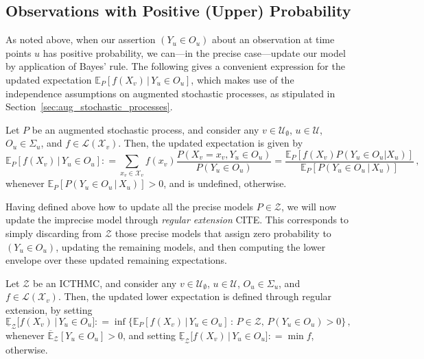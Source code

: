 \documentclass[twoside,11pt]{article}
\newcommand{\states}{\mathcal{X}}
\newcommand{\gambles}{\mathcal{L}}
\newcommand{\coloneqq}{:\!=}
\begin{document}
\subsection{Observations with Positive (Upper) Probability}

As noted above, when our assertion $(Y_u\in O_u)$ about an observation at time points $u$ has positive probability, we can---in the precise case---update our model by application of Bayes' rule. The following gives a convenient expression for the updated expectation $\mathbb{E}_P[f(X_v)\,\vert\,Y_u\in O_u]$, which makes use of the independence assumptions on augmented stochastic processes, as stipulated in Section~\ref{sec:aug_stochastic_processes}.

\begin{proposition}\label{prop:precise_conditioning_for_positive}
Let $P$ be an augmented stochastic process, and consider any $v\in\mathcal{U}_\emptyset$, $u\in\mathcal{U}$, $O_u\in\Sigma_u$, and $f\in\gambles(\states_v)$. Then, the updated expectation is given by
\begin{equation*}
\mathbb{E}_P[f(X_v)\,\vert\,Y_u\in O_u] \coloneqq \sum_{x_v\in\states_v}f(x_v)\frac{P(X_v=x_v, Y_u\in O_u)}{P(Y_u\in O_u)} = \frac{\mathbb{E}_P[f(X_v)P(Y_u\in O_u\vert X_u)]}{\mathbb{E}_P[P(Y_u\in O_u\,\vert\,X_u)]}\,,
\end{equation*}
whenever $\mathbb{E}_P[P(Y_u\in O_u\,\vert\,X_u)]>0$, and is undefined, otherwise.
\end{proposition}

Having defined above how to update all the precise models $P\in\mathcal{Z}$, we will now update the imprecise model through \emph{regular extension} CITE. This corresponds to simply discarding from $\mathcal{Z}$ those precise models that assign zero probability to $(Y_u\in O_u)$, updating the remaining models, and then computing the lower envelope over these updated remaining expectations.

\begin{definition}
Let $\mathcal{Z}$ be an ICTHMC, and consider any $v\in\mathcal{U}_\emptyset$, $u\in\mathcal{U}$, $O_u\in\Sigma_u$, and $f\in\gambles(\states_v)$. Then, the updated lower expectation is defined through regular extension, by setting
\begin{equation*}
\underline{\mathbb{E}}_{\mathcal{Z}}\bigl[f(X_v)\,\vert\,Y_u\in O_u\bigr] \coloneqq \inf\bigl\{ \mathbb{E}_P[f(X_v)\,\vert\,Y_u\in O_u]\,:\, P\in\mathcal{Z},\, P(Y_u\in O_u)>0 \bigr\}\,,
\end{equation*}
whenever $\overline{\mathbb{E}}_\mathcal{Z}[Y_u\in O_u] >0$, and setting $\underline{\mathbb{E}}_{\mathcal{Z}}\bigl[f(X_v)\,\vert\,Y_u\in O_u\bigr]\coloneqq\min f$, otherwise.
\end{definition}
\end{document}
